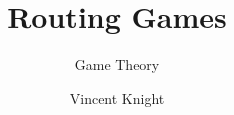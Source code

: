 \documentclass[xcolor=table]{beamer}
\title{Routing Games}
\subtitle{Game Theory}
\author{Vincent Knight}
\date{}
\begin{document}
\frame{\titlepage}
\end{document}
